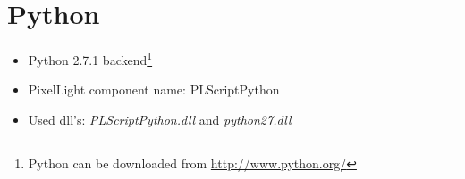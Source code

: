 \section{Python}
\begin{itemize}
\item Python 2.7.1 backend\footnote{Python can be downloaded from \url{http://www.python.org/}}
\item PixelLight component name: PLScriptPython
\item Used dll's: \emph{PLScriptPython.dll} and \emph{python27.dll}
\end{itemize}
